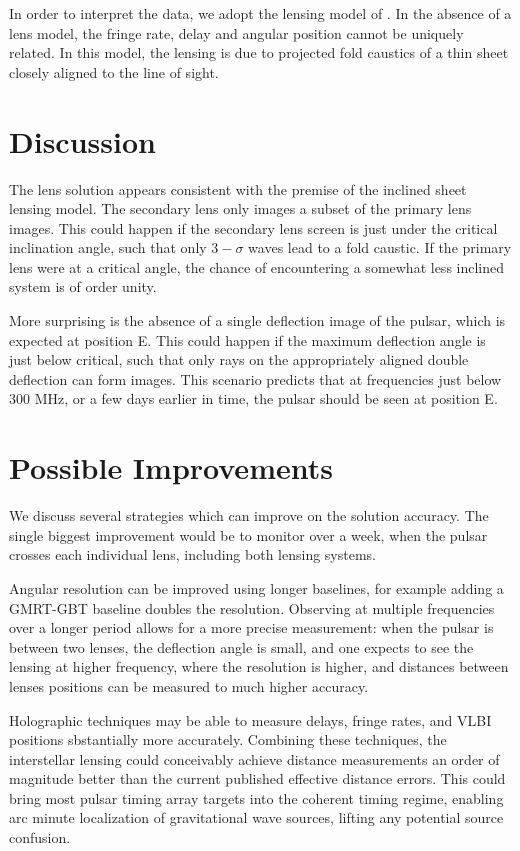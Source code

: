 \documentclass[useAMS,usenatbib]{mn2e}
\begin{document}
In order to interpret the data, we adopt the lensing model of
\citet{2014MNRAS.442.3338P}.  In the absence of a lens model, the
fringe rate, delay and angular position cannot be uniquely related. In
this model, the lensing is due to projected fold caustics of a thin
sheet closely aligned to the line of sight.

\section{Discussion}

The lens solution appears consistent with the premise of the inclined
sheet lensing model\citep{2014MNRAS.442.3338P}.  The secondary lens
only images a subset of the primary lens images.  This could happen if
the secondary lens screen is just under the critical inclination
angle, such that only $3-\sigma$ waves lead to a fold caustic.  If the
primary lens were at a critical angle, the chance of encountering a
somewhat less inclined system is of order unity.

More surprising is the absence of a single deflection image of the
pulsar, which is expected at position E.  This could happen if the
maximum deflection angle is just below critical, such that only rays
on the appropriately aligned double deflection can form images.  This
scenario predicts that at frequencies just below 300 MHz, or a few
days earlier in time, the pulsar should be seen at position E.

\section{Possible Improvements}

We discuss several strategies which can improve on the solution
accuracy.  The single biggest improvement would be to monitor over a
week, when the pulsar crosses each individual lens, including both
lensing systems.

Angular resolution can be improved using longer baselines, for example
adding a GMRT-GBT baseline doubles the resolution.  Observing at
multiple frequencies over a longer period allows for a more precise
measurement: when the pulsar is between two lenses, the deflection
angle is small, and one expects to see the lensing at higher
frequency, where the resolution is higher, and distances between
lenses positions can be measured to much higher accuracy.

Holographic techniques\citep{2008MNRAS.388.1214W,2014MNRAS.440L..36P}
may be able to measure delays, fringe rates, and VLBI positions
sbstantially more accurately.  Combining these techniques, the
interstellar lensing could conceivably achieve distance measurements
an order of magnitude better than the current published effective
distance errors.  This could bring most pulsar timing array targets
into the coherent timing regime, enabling arc minute localization of
gravitational wave sources, lifting any potential source confusion.
\end{document}

